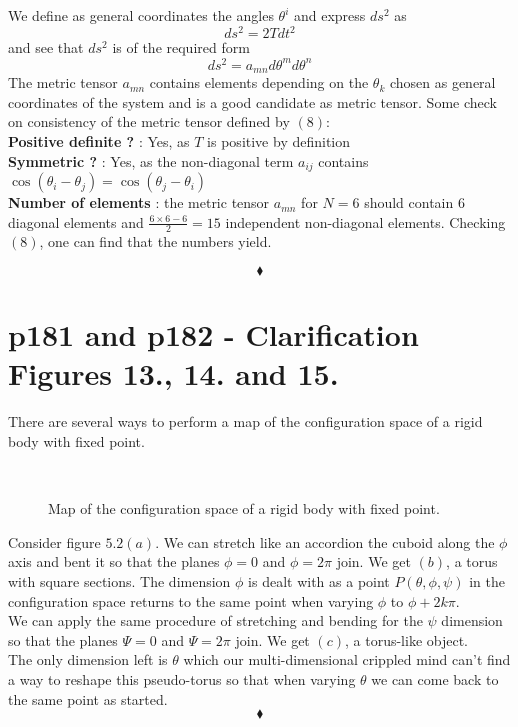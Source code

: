 We define as general coordinates the angles $\theta^i$
and express $ds^2$ as 
$$ds^2= 2Tdt^2$$ 
and see that $ds^2$ is of the required form 
$$ds^2= a_{mn}d\theta^md\theta^n$$
The metric tensor $a_{mn}$ contains elements depending on the $\theta_k$ chosen as general coordinates of the system and is a good candidate as metric tensor.
Some check on consistency of the metric tensor defined by $(8)$:\\
\textbf{Positive definite ?} : Yes, as $T$ is positive by definition\\
\textbf{Symmetric ?} : Yes, as the non-diagonal term $a_{ij}$ contains $\cos\left(\theta_i-\theta_j\right) = \cos\left(\theta_j-\theta_i\right)$ \\
\textbf{Number of elements} : the metric tensor $a_{mn}$ for $N=6$ should contain $6$ diagonal elements and $\frac{6\times 6 -6}{2} = 15$ independent non-diagonal elements. Checking $(8)$, one can find that the numbers yield.


$$\blacklozenge$$
\newpage


\section{p181 and p182 - Clarification Figures 13., 14. and 15.}
\begin{tcolorbox}
There are several ways to perform  a map of the configuration space of a rigid body with fixed point.
\end{tcolorbox}
\begin{figure}[H]
    \centering
    \subfloat[]{}
	\
    \subfloat[]{}
    \qquad
    \subfloat[]{}
\caption{Map of the configuration space of a rigid body with fixed point.}
\label{fig:fig_p181}
\end{figure}
Consider figure $5.2 (a)$. We can stretch like an accordion the cuboid along the $\phi$ axis and bent it so that the planes $\phi=0$ and $\phi=2\pi$ join. We get $(b)$,  a torus with square sections. The dimension $\phi$ is dealt with as a point $P\left( \theta, \phi, \psi \right)$ in the configuration space  returns to the same point when varying $\phi$ to $\phi+2k\pi$.\\
We can apply the same procedure of stretching and bending for the $\psi$ dimension so that the planes $\Psi=0$ and $\Psi=2\pi$ join.
We get $(c)$,  a torus-like object.\\
The only dimension left is $\theta$ which our multi-dimensional crippled mind can't find a way to reshape this pseudo-torus so that when varying $\theta$ we can come back to the same point as started.
$$\blacklozenge$$
\newpage

